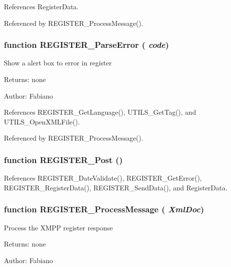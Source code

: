 References RegisterData.

Referenced by REGISTER\_\-ProcessMessage().
\subsubsection{\setlength{\rightskip}{0pt plus 5cm}function REGISTER\_\-ParseError ( {\em code})}\label{register_8js_a9961667728099b1c4c97a1c5ee778be}


Show a alert box to error in register

\begin{Desc}
\item[Returns:]none \end{Desc}
\begin{Desc}
\item[Author:]Fabiano \end{Desc}


References REGISTER\_\-GetLanguage(), UTILS\_\-GetTag(), and UTILS\_\-OpenXMLFile().

Referenced by REGISTER\_\-ProcessMessage().
\subsubsection{\setlength{\rightskip}{0pt plus 5cm}function REGISTER\_\-Post ()}\label{register_8js_8d73a5840a1e6955fc6b61e824d60709}




References REGISTER\_\-DateValidate(), REGISTER\_\-GetError(), REGISTER\_\-RegisterData(), REGISTER\_\-SendData(), and RegisterData.
\subsubsection{\setlength{\rightskip}{0pt plus 5cm}function REGISTER\_\-ProcessMessage ( {\em XmlDoc})}\label{register_8js_071c2098a32807d7c980d9b42d35f2c8}


Process the XMPP register response

\begin{Desc}
\item[Returns:]none \end{Desc}
\begin{Desc}
\item[Author:]Fabiano \end{Desc}



